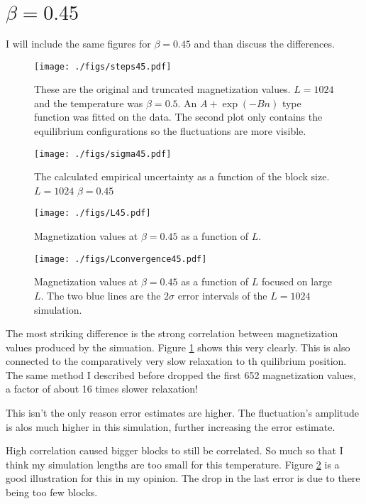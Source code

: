 \documentclass[pdftex,12pt,a4paper]{article}
\begin{document}
	\section{$\beta=0.45$}
		I will include the same figures for $\beta = 0.45$ and than discuss the differences.
		\begin{figure}[H]
			\centering
			\texttt{[image: ./figs/steps45.pdf]}
			\caption{These are the original and truncated magnetization values. $L=1024$ and the temperature was $\beta=0.5$. An $A+\exp(-Bn)$ type function was fitted on the data. The second plot only contains the equilibrium configurations so the fluctuations are more visible.}
			\label{steps45}
		\end{figure}
		\begin{figure}[H]
			\centering
			\texttt{[image: ./figs/sigma45.pdf]}
			\caption{The calculated empirical uncertainty as a function of the block size. $L=1024$ $\beta=0.45$}
			\label{sigma45}
		\end{figure}
		\begin{figure}[H]
			\centering
			\texttt{[image: ./figs/L45.pdf]}
			\caption{Magnetization values at $\beta=0.45$ as a function of $L$.}
			\label{L45}
		\end{figure}
		\begin{figure}[H]
			\centering
			\texttt{[image: ./figs/Lconvergence45.pdf]}
			\caption{Magnetization values at $\beta=0.45$ as a function of $L$ focused on large $L$. The two blue lines are the $2\sigma$ error intervals of the $L=1024$ simulation.}
			\label{Lconergence45}
		\end{figure}
		The most striking difference is the strong correlation between magnetization values produced by the simuation. Figure \ref{steps45} shows this very clearly. This is also connected to the comparatively very slow relaxation to th quilibrium position. The same method I described before dropped the first 652 magnetization values, a factor of about 16 times slower relaxation!
		
		This isn't the only reason error estimates are higher. The fluctuation's amplitude is alos much higher in this simulation, further increasing the error estimate.
		
		High correlation caused bigger blocks to still be correlated. So much so that I think my simulation lengths are too small for this temperature. Figure \ref{sigma45} is a good illustration for this in my opinion. The drop in the last error is due to there being too few blocks.
		
\end{document}
